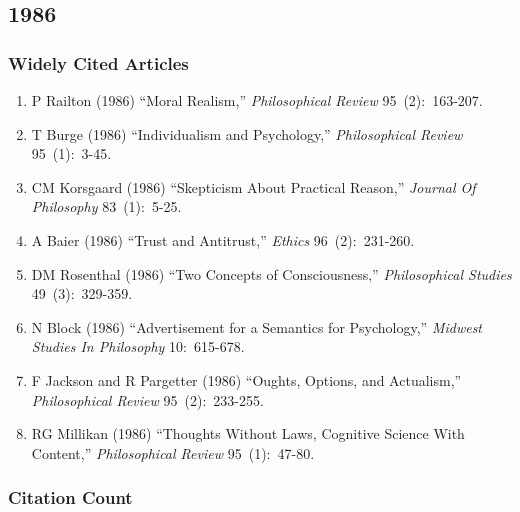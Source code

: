 \documentclass[
  10pt,
  letterpaper,
  DIV=11,
  numbers=noendperiod,
  twoside]{scrartcl}
\providecommand{\tightlist}{%
  \setlength{\itemsep}{0pt}\setlength{\parskip}{0pt}}\usepackage{longtable,booktabs,array}
\begin{document}
\newpage

\subsection{1986}\label{sec-s1986}

\subsubsection*{Widely Cited Articles}\label{widely-cited-articles-30}

\begin{enumerate}
\def\labelenumi{\arabic{enumi}.}
\tightlist
\item
  P Railton (1986) ``Moral Realism,'' \emph{Philosophical Review}
  95~(2):~163-207.
\item
  T Burge (1986) ``Individualism and Psychology,'' \emph{Philosophical
  Review} 95~(1):~3-45.
\item
  CM Korsgaard (1986) ``Skepticism About Practical Reason,''
  \emph{Journal Of Philosophy} 83~(1):~5-25.
\item
  A Baier (1986) ``Trust and Antitrust,'' \emph{Ethics} 96~(2):~231-260.
\item
  DM Rosenthal (1986) ``Two Concepts of Consciousness,''
  \emph{Philosophical Studies} 49~(3):~329-359.
\item
  N Block (1986) ``Advertisement for a Semantics for Psychology,''
  \emph{Midwest Studies In Philosophy} 10:~615-678.
\item
  F Jackson and R Pargetter (1986) ``Oughts, Options, and Actualism,''
  \emph{Philosophical Review} 95~(2):~233-255.
\item
  RG Millikan (1986) ``Thoughts Without Laws, Cognitive Science With
  Content,'' \emph{Philosophical Review} 95~(1):~47-80.
\end{enumerate}

\subsubsection*{Citation Count}\label{sec-count-1986}
\end{document}
